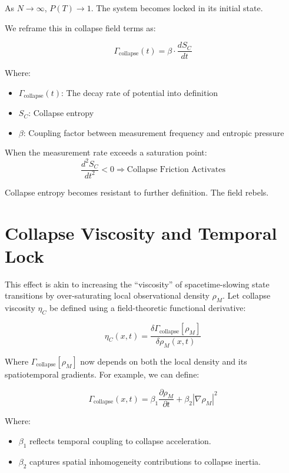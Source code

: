 As \( N \rightarrow \infty \), \( P(T) \rightarrow 1 \). The system becomes locked in its initial state.

We reframe this in collapse field terms as:

\[
\Gamma_{\text{collapse}}(t) = \beta \cdot \frac{dS_C}{dt}
\]

Where:
\begin{itemize}
    \item \( \Gamma_{\text{collapse}}(t) \): The decay rate of potential into definition
    \item \( S_C \): Collapse entropy
    \item \( \beta \): Coupling factor between measurement frequency and entropic pressure
\end{itemize}

When the measurement rate exceeds a saturation point:
\[
\frac{d^2S_C}{dt^2} < 0 \Rightarrow \text{Collapse Friction Activates}
\]

Collapse entropy becomes resistant to further definition. The field rebels.

\section{Collapse Viscosity and Temporal Lock}

This effect is akin to increasing the “viscosity” of spacetime-slowing state transitions by over-saturating local observational density $\rho_M$. Let collapse viscosity $\eta_C$ be defined using a field-theoretic functional derivative:

\begin{equation}
\eta_C(x,t) = \frac{\delta \Gamma_{\text{collapse}}[\rho_M]}{\delta \rho_M(x,t)}
\end{equation}

Where $\Gamma_{\text{collapse}}[\rho_M]$ now depends on both the local density and its spatiotemporal gradients. For example, we can define:

\begin{equation}
\Gamma_{\text{collapse}}(x,t) = \beta_1 \frac{\partial \rho_M}{\partial t} + \beta_2 |\nabla \rho_M|^2
\end{equation}

Where:
\begin{itemize}
    \item $\beta_1$ reflects temporal coupling to collapse acceleration.
    \item $\beta_2$ captures spatial inhomogeneity contributions to collapse inertia.
\end{itemize}

